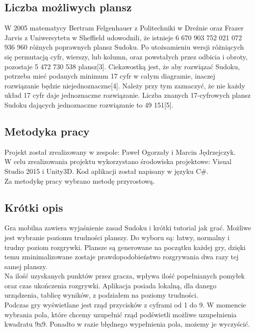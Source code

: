 \documentclass[a4paper, 11pt]{article}
\begin{document}
\subsection{Liczba możliwych plansz}
W 2005 matematycy Bertram Felgenhauer z Politechniki w Dreźnie oraz Frazer Jarvis z Uniwersytetu w Sheffield udowodnili, że istnieje 6 670 903 752 021 072 936 960 różnych poprawnych plansz Sudoku. Po utożsamieniu wersji różniących się permutacją cyfr, wierszy, lub kolumn, oraz powstałych przez odbicia i obroty, pozostaje 5 472 730 538 plansz[3]. Ciekawostką jest, że aby rozwiązać Sudoku, potrzeba mieć podanych minimum 17 cyfr w całym diagramie, inaczej rozwiązanie będzie niejednoznaczne[4]. Należy przy tym zaznaczyć, że nie każdy układ 17 cyfr daje jednoznaczne rozwiązanie. Liczba znanych 17-cyfrowych plansz Sudoku dających jednoznaczne rozwiązanie to 49 151[5].
\subsection{Metodyka pracy}
Projekt został zrealizowany w zespole: Paweł Ogorzały i Marcin Jędrzejczyk.\\
W celu zrealizowania projektu wykorzystano środowiska projektowe: Visual Studio 2015 i Unity3D. Kod aplikacji został napisany w języku C\#.\\
Za metodykę pracy wybrano metodę przyrostową.
	
\subsection{Krótki opis}	
	Gra mobilna  zawiera wyjaśnienie zasad Sudoku i krótki tutorial jak grać. Możliwe jest wybranie poziomu trudności planszy. Do wyboru są: łatwy, normalny i trudny poziom rozgrywki. Plansze są generowane na początku każdej gry, dzięki temu zminimalizowane zostaje prawdopodobieństwo rozgrywania dwa razy tej samej planszy.\\

Na ilość uzyskanych punktów przez gracza, wpływa ilość popełnianych pomyłek oraz czas ukończenia rozgrywki. Aplikacja posiada lokalną, dla danego urządzenia, tablicę wyników, z podziałem na poziomy trudności.\\

Podczas gry wyświetlane jest rząd przycisków z cyframi od 1 do 9. W momencie wybrania pola, które chcemy uzupełnić rząd podświetli możliwe uzupełnienia kwadratu 9x9. Ponadto w razie błędnego wypełnienia pola, możemy je wyczyścić.

	
\vfill
\newpage	
\end{document}
